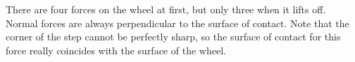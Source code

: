There are four
forces on the wheel at first, but only three when it lifts
off. Normal forces are always perpendicular to the surface
of contact. Note that the corner of the step cannot be
perfectly sharp, so the surface of contact for this force
really coincides with the surface of the wheel.
